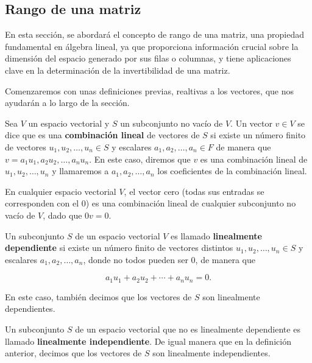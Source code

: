 \subsection{Rango de una matriz}\label{subsec:rango-matriz}

En esta sección, se abordará el concepto de rango de una matriz, una propiedad fundamental en álgebra lineal, ya que proporciona información crucial sobre la dimensión del espacio generado por sus filas o columnas, y tiene aplicaciones clave en la determinación de la invertibilidad de una matriz.\newline

Comenzaremos con unas definiciones previas, realtivas a los vectores, que nos ayudarán a lo largo de la sección.
\begin{definicion}
    Sea $V$ un espacio vectorial y $S$ un subconjunto no vacío de $V$. Un vector $v \in V$ se dice que es una \textbf{combinación lineal} de vectores de $S$ si existe un número finito de vectores $u_{1}, u_{2}, \ldots, u_{n} \in S$ y escalares $a_{1}, a_{2}, \ldots, a_{n} \in F$ de manera que $v = a_{1}u_{1}, a_{2}u_{2}, \ldots, a_{n}u_{n}$. En este caso, diremos que $v$ es una combinación lineal de $u_{1}, u_{2}, \ldots, u_{n}$ y llamaremos a $a_{1}, a_{2}, \ldots, a_{n}$ los coeficientes de la combinación lineal.\newline 
\end{definicion}

\begin{observacion}
    En cualquier espacio vectorial $V$, el vector cero (todas sus entradas se corresponden con el $0$) es una combinación lineal de cualquier subconjunto no vacío de $V$, dado que $0v = 0$.\newline 
\end{observacion}

\begin{definicion}
    Un subconjunto $S$ de un espacio vectorial $V$ es llamado \textbf{linealmente dependiente} si existe un número finito de vectores distintos $u_{1}, u_{2}, \ldots, u_{n} \in S$ y escalares $a_{1}, a_{2}, \ldots, a_{n}$, donde no todos pueden ser $0$, de manera que

    \[ a_{1}u_{1} + a_{2}u_{2} + \cdots + a_{n}u_{n} = 0. \]

    En este caso, también decimos que los vectores de $S$ son linealmente dependientes.\newline
\end{definicion}

\begin{definicion}
    Un subconjunto $S$ de un espacio vectorial que no es linealmente dependiente es llamado \textbf{linealmente independiente}. De igual manera que en la definición anterior, decimos que los vectores de $S$ son linealmente independientes.\newline
\end{definicion}

